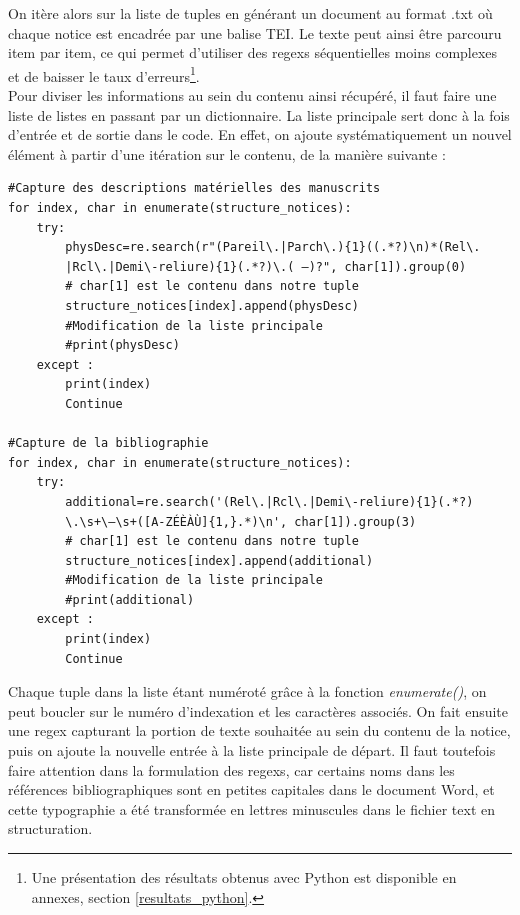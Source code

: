 \documentclass[a4paper,12pt,twoside]{book}
\begin{document}
On itère alors sur la liste de tuples en générant un document au format .txt où chaque notice est encadrée par une balise TEI. Le texte peut ainsi être parcouru item par item, ce qui permet d’utiliser des regexs séquentielles moins complexes et de baisser le taux d’erreurs\footnote{Une présentation des résultats obtenus avec Python est disponible en annexes, section \ref{resultats_python}.}.\\

Pour diviser les informations au sein du contenu ainsi récupéré, il faut faire une liste de listes en passant par un dictionnaire. La liste principale sert donc à la fois d'entrée et de sortie dans le code. En effet, on ajoute systématiquement un nouvel élément à partir d’une itération sur le contenu, de la manière suivante :
\begin{verbatim}
#Capture des descriptions matérielles des manuscrits 
for index, char in enumerate(structure_notices):
    try:
        physDesc=re.search(r"(Pareil\.|Parch\.){1}((.*?)\n)*(Rel\.
        |Rcl\.|Demi\-reliure){1}(.*?)\.( —)?", char[1]).group(0)  
        # char[1] est le contenu dans notre tuple
        structure_notices[index].append(physDesc)  
        #Modification de la liste principale
        #print(physDesc)
    except :
        print(index)
        Continue

#Capture de la bibliographie
for index, char in enumerate(structure_notices):
    try:
        additional=re.search('(Rel\.|Rcl\.|Demi\-reliure){1}(.*?)
        \.\s+\—\s+([A-ZÉÈÀÙ]{1,}.*)\n', char[1]).group(3)  
        # char[1] est le contenu dans notre tuple
        structure_notices[index].append(additional) 
        #Modification de la liste principale
        #print(additional)
    except :
        print(index)
        Continue
\end{verbatim}
Chaque tuple dans la liste étant numéroté grâce à la fonction \textit{enumerate()}, on peut boucler sur le numéro d'indexation et les caractères associés. On fait ensuite une regex capturant la portion de texte souhaitée au sein du contenu de la notice, puis on ajoute la nouvelle entrée à la liste principale de départ. 
Il faut toutefois faire attention dans la formulation des regexs, car certains noms dans les références bibliographiques sont en petites capitales dans le document Word, et cette typographie a été transformée en lettres minuscules dans le fichier text en structuration. 
\end{document}
